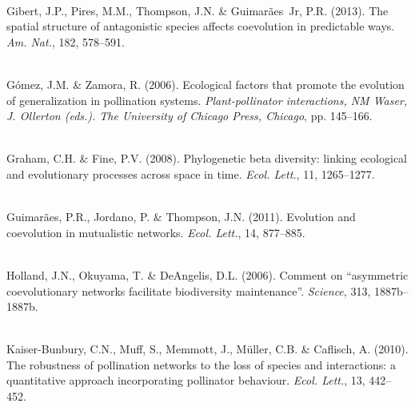 \documentclass[12pt]{article}
\begin{document}
\begin{thebibliography}{67}
\hspace{0em}\\Gibert, J.P., Pires, M.M., Thompson, J.N. \& Guimar{\~a}es~Jr,
  P.R. (2013).
\newblock The spatial structure of antagonistic species affects coevolution in
  predictable ways.
\newblock \emph{Am. Nat.}, 182, 578--591.

\hspace{0em}\\G{\'o}mez, J.M. \& Zamora, R. (2006).
\newblock Ecological factors that promote the evolution of generalization in
  pollination systems.
\newblock \emph{Plant-pollinator interactions, NM Waser, J. Ollerton (eds.).
  The University of Chicago Press, Chicago}, pp. 145--166.

\hspace{0em}\\Graham, C.H. \& Fine, P.V. (2008).
\newblock Phylogenetic beta diversity: linking ecological and evolutionary
  processes across space in time.
\newblock \emph{Ecol. Lett.}, 11, 1265--1277.

\hspace{0em}\\Guimar{\~a}es, P.R., Jordano, P. \& Thompson, J.N. (2011).
\newblock Evolution and coevolution in mutualistic networks.
\newblock \emph{Ecol. Lett.}, 14, 877--885.

\hspace{0em}\\Holland, J.N., Okuyama, T. \& DeAngelis, D.L. (2006).
\newblock Comment on ``asymmetric coevolutionary networks facilitate
  biodiversity maintenance''.
\newblock \emph{Science}, 313, 1887b--1887b.

\hspace{0em}\\Kaiser-Bunbury, C.N., Muff, S., Memmott, J., M{\"u}ller, C.B. \&
  Caflisch, A. (2010).
\newblock The robustness of pollination networks to the loss of species and
  interactions: a quantitative approach incorporating pollinator behaviour.
\newblock \emph{Ecol. Lett.}, 13, 442--452.


\end{thebibliography}
\end{document}
